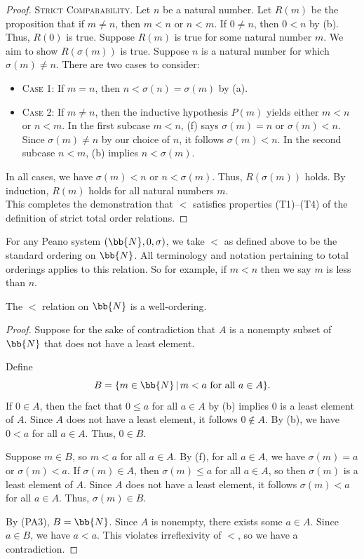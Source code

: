 \begin{proof}
	\textsc{Strict Comparability.}
	Let $n$ be a natural number.
	Let $R(m)$ be the proposition that if $m\ne n$, then $m < n$ or $n < m$. 
	If $0\ne n$, then $0 < n$ by  (b).
	Thus, $R(0)$ is true. 
	Suppose $R(m)$ is true for some natural number $m$. 
	We aim to show $R(\sigma(m))$ is true. 
	Suppose $n$ is a natural number for which $\sigma(m)\ne n$. 
	There are two cases to consider:
	\begin{itemize}[itemsep=-0.4ex]
		\item\textsc{Case 1:}
		If $m = n$, then $n < \sigma(n) = \sigma(m)$ by  (a).
		\item\textsc{Case 2:}
		If $m\ne n$, then the inductive hypothesis $P(m)$ yields either $m < n$ or $n < m$. 
		In the first subcase $m < n$,  (f) says $\sigma(m) = n$ or $\sigma(m) < n$. 
		Since $\sigma(m)\ne n$ by our choice of $n$, it follows $\sigma(m) < n$. 
		In the second subcase $n < m$,  (b) implies $n < \sigma(m)$. 
	\end{itemize}
	In all cases, we have $\sigma(m) < n$ or $n < \sigma(m)$. 
	Thus, $R(\sigma(m))$ holds. 
	By induction, $R(m)$ holds for all natural numbers $m$. \\
	
	This completes the demonstration that $<$ satisfies properties (T1)--(T4) of the definition of strict total order relations. 
\end{proof}

For any Peano system $(\bb{N}, 0, \sigma)$, we take $<$ as defined above to be the standard ordering on $\bb{N}$. 
All terminology and notation pertaining to total orderings applies to this relation. 
So for example, if $m < n$ then we say $m$ is less than $n$. 

\begin{theorem}
	The $<$ relation on $\bb{N}$ is a well-ordering. 
\end{theorem}
\begin{proof}
	Suppose for the sake of contradiction that $A$ is a nonempty subset of $\bb{N}$ that does not have a least element.
	
	Define
	\[ B = \{ m\in\bb{N} \,|\, m < a \text{ for all } a\in A \}. \]
	If $0\in A$, then the fact that $0\le a$ for all $a\in A$ by  (b) implies $0$ is a least element of $A$. 
	Since $A$ does not have a least element, it follows $0\notin A$. 
	By  (b), we have $0 < a$ for all $a\in A$. 
	Thus, $0\in B$. 
	
	Suppose $m\in B$, so $m < a$ for all $a\in A$. 
	By  (f), for all $a\in A$, we have $\sigma(m) = a$ or $\sigma(m) < a$. 
	If $\sigma(m)\in A$, then $\sigma(m)\le a$ for all $a\in A$, so then $\sigma(m)$ is a least element of $A$.
	Since $A$ does not have a least element, it follows $\sigma(m) < a$ for all $a\in A$. 
	Thus, $\sigma(m)\in B$. 
	
	By (PA3), $B = \bb{N}$. 
	Since $A$ is nonempty, there exists some $a\in A$.
	Since $a\in B$, we have $a < a$.
	This violates irreflexivity of $<$, so we have a contradiction. 
\end{proof}

